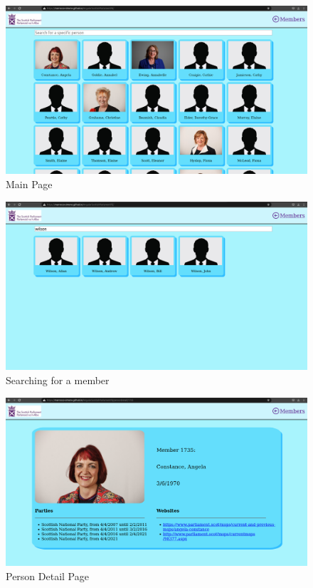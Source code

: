 \documentclass[12pt, a4paper]{article}
\begin{document}
  \begin{figure}[H]
    \centering
    \includegraphics[width=\columnwidth]{main.png}
    \caption{Main Page}
  \end{figure}
  \begin{figure}[H]
    \centering
    \includegraphics[width=\columnwidth]{search_bar.png}
    \caption{Searching for a member}
  \end{figure}
  \begin{figure}[H]
    \centering
    \includegraphics[width=\columnwidth]{full.png}
    \caption{Person Detail Page}
  \end{figure}
\end{document}
